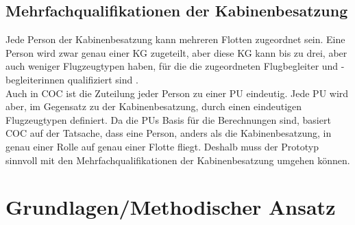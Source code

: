 \documentclass [12pt, a4paper, oneside, titlepage, ngerman]{article}
\begin{document}
\subsection{Mehrfachqualifikationen der Kabinenbesatzung}
Jede Person der Kabinenbesatzung kann mehreren Flotten zugeordnet sein. Eine Person wird zwar genau einer \ac{KG} zugeteilt, aber diese \ac{KG} kann bis zu drei, aber auch weniger Flugzeugtypen haben, für die die zugeordneten Flugbegleiter und -begleiterinnen qualifiziert sind \cite[vgl.][]{Gespraech2}. \\
Auch in \ac {COC} ist die Zuteilung jeder Person zu einer \ac{PU} eindeutig. Jede \ac{PU} wird aber, im Gegensatz zu der Kabinenbesatzung, durch einen eindeutigen Flugzeugtypen definiert. Da die \acp{PU} Basis für die Berechnungen sind, basiert \ac{COC} auf der Tatsache, dass eine Person, anders als die Kabinenbesatzung, in genau einer Rolle auf genau einer Flotte fliegt. Deshalb muss der Prototyp sinnvoll mit den Mehrfachqualifikationen der Kabinenbesatzung umgehen können. 

\newpage

\section {Grundlagen/Methodischer Ansatz}
\end{document}
